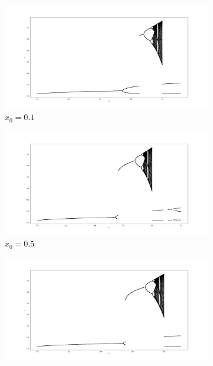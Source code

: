 \begin{figure}[h!]
	\centering
	
	\begin{subfigure}[b]{0.7\textwidth}
		\centering
		\includegraphics[width=\textwidth]{LateX images/graphs q14/g1}
		\caption{\(x_0=0.1\)}
		\label{f:g19}
	\end{subfigure}
	\hfill
	\begin{subfigure}[b]{0.7\textwidth}
		\centering
		\includegraphics[width=\textwidth]{LateX images/graphs q14/g2}
		\caption{\(x_0=0.5\)}
		\label{f:g20}
	\end{subfigure}
	\hfill
	\begin{subfigure}[b]{0.7\textwidth}
		\centering
		\includegraphics[width=\textwidth]{LateX images/graphs q14/g3}

\end{subfigure}
\end{figure}
